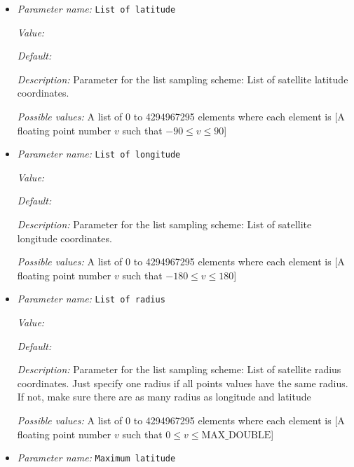 \begin{itemize}
\item {\it Parameter name:} {\tt List of latitude}
\label{parameters:Postprocess/Gravity calculation/List of latitude}
\label{parameters:Postprocess/Gravity_20calculation/List_20of_20latitude}


{\it Value:} 


{\it Default:} 


{\it Description:} Parameter for the list sampling scheme: List of satellite latitude coordinates.


{\it Possible values:} A list of 0 to 4294967295 elements where each element is [A floating point number $v$ such that $-90 \leq v \leq 90$]
\item {\it Parameter name:} {\tt List of longitude}
\label{parameters:Postprocess/Gravity calculation/List of longitude}
\label{parameters:Postprocess/Gravity_20calculation/List_20of_20longitude}


{\it Value:} 


{\it Default:} 


{\it Description:} Parameter for the list sampling scheme: List of satellite longitude coordinates.


{\it Possible values:} A list of 0 to 4294967295 elements where each element is [A floating point number $v$ such that $-180 \leq v \leq 180$]
\item {\it Parameter name:} {\tt List of radius}
\label{parameters:Postprocess/Gravity calculation/List of radius}
\label{parameters:Postprocess/Gravity_20calculation/List_20of_20radius}


{\it Value:} 


{\it Default:} 


{\it Description:} Parameter for the list sampling scheme: List of satellite radius coordinates. Just specify one radius if all points values have the same radius. If not, make sure there are as many radius as longitude and latitude


{\it Possible values:} A list of 0 to 4294967295 elements where each element is [A floating point number $v$ such that $0 \leq v \leq \text{MAX\_DOUBLE}$]
\item {\it Parameter name:} {\tt Maximum latitude}
\label{parameters:Postprocess/Gravity calculation/Maximum latitude}
\label{parameters:Postprocess/Gravity_20calculation/Maximum_20latitude}



\end{itemize}

